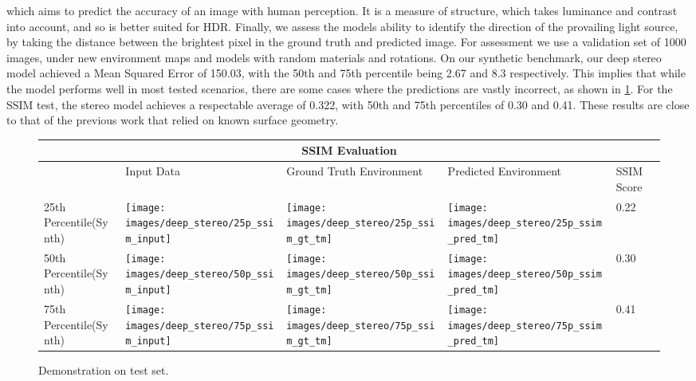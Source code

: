 \documentclass[ %
                    author={Gavin Parker},
                supervisor={Dr. Neill Campbell},
                    degree={MEng},
                     title={Deep Siamese Networks for Illumination Estimation from Stereo Images},
                  subtitle={},
                      type={research},
                      year={2018} ]{dissertation}
\begin{document}
which aims to predict the accuracy of an image with human perception. It is a measure of structure, which takes luminance and contrast into account, and so is better suited for HDR. Finally, we assess the models ability to identify the direction of the provailing light source, by taking the distance between the brightest pixel in the ground truth and predicted image. For assessment we use a validation set of 1000 images, under new environment maps and models with random materials and rotations.
\newline
On our synthetic benchmark, our deep stereo model achieved a Mean Squared Error of 150.03, with the 50th and 75th percentile being 2.67 and 8.3 respectively. This implies that while the model performs well in most tested scenarios, there are some cases where the predictions are vastly incorrect, as shown in \ref{ssim_results}. For the SSIM test, the stereo model achieves a respectable average of 0.322, with 50th and 75th percentiles of 0.30 and 0.41. These results are close to that of the previous work that relied on known surface geometry.
\begin{figure}
\centering
\begin{tabular}{ |p{3cm}||p{3cm}|p{3cm}|p{3cm}|p{3cm}|  }
 \hline
 \multicolumn{5}{|c|}{SSIM Evaluation} \\
 \hline
  & Input Data &Ground Truth Environment&Predicted Environment&SSIM Score\\
 \hline
 25th Percentile(Synth)&\parbox[c]{1em}{
 \texttt{[image: images/deep\_stereo/25p\_ssim\_input]}}&\parbox[c]{1em}{\texttt{[image: images/deep\_stereo/25p\_ssim\_gt\_tm]}}&
\parbox[c]{1em}{\texttt{[image: images/deep\_stereo/25p\_ssim\_pred\_tm]}}& 0.22\\
 50th Percentile(Synth)&\parbox[c]{1em}{
 \texttt{[image: images/deep\_stereo/50p\_ssim\_input]}}&\parbox[c]{1em}{\texttt{[image: images/deep\_stereo/50p\_ssim\_gt\_tm]}}&
\parbox[c]{1em}{\texttt{[image: images/deep\_stereo/50p\_ssim\_pred\_tm]}}& 0.30\\
 75th Percentile(Synth)&\parbox[c]{1em}{
 \texttt{[image: images/deep\_stereo/75p\_ssim\_input]}}&\parbox[c]{1em}{\texttt{[image: images/deep\_stereo/75p\_ssim\_gt\_tm]}}&
\parbox[c]{1em}{\texttt{[image: images/deep\_stereo/75p\_ssim\_pred\_tm]}}& 0.41\\

 \hline
\end{tabular}

\label{ssim_results}
\caption{Demonstration on test set.}

\end{figure}
\end{document}

